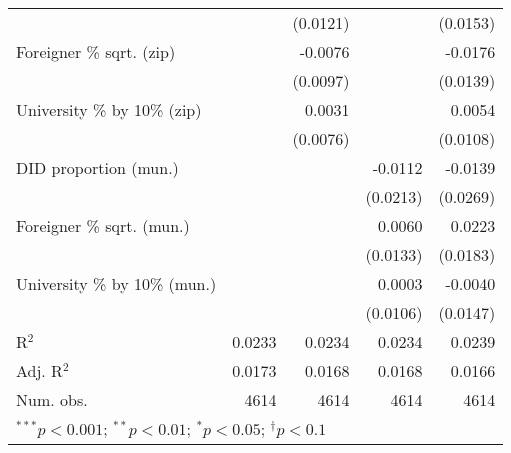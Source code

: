 \begin{tabular}{l D{.}{.}{4.7} D{.}{.}{4.7} D{.}{.}{4.7} D{.}{.}{4.7}}
                                  &               & (0.0121)      &               & (0.0153)      \\
Foreigner \% sqrt. (zip)          &               & -0.0076       &               & -0.0176       \\
                                  &               & (0.0097)      &               & (0.0139)      \\
University \% by 10\% (zip)       &               & 0.0031        &               & 0.0054        \\
                                  &               & (0.0076)      &               & (0.0108)      \\
DID proportion (mun.)             &               &               & -0.0112       & -0.0139       \\
                                  &               &               & (0.0213)      & (0.0269)      \\
Foreigner \% sqrt. (mun.)         &               &               & 0.0060        & 0.0223        \\
                                  &               &               & (0.0133)      & (0.0183)      \\
University \% by 10\% (mun.)      &               &               & 0.0003        & -0.0040       \\
                                  &               &               & (0.0106)      & (0.0147)      \\
\midrule
R$^2$                             & 0.0233        & 0.0234        & 0.0234        & 0.0239        \\
Adj. R$^2$                        & 0.0173        & 0.0168        & 0.0168        & 0.0166        \\
Num. obs.                         & 4614          & 4614          & 4614          & 4614          \\
\bottomrule
{}
\end{tabular}
